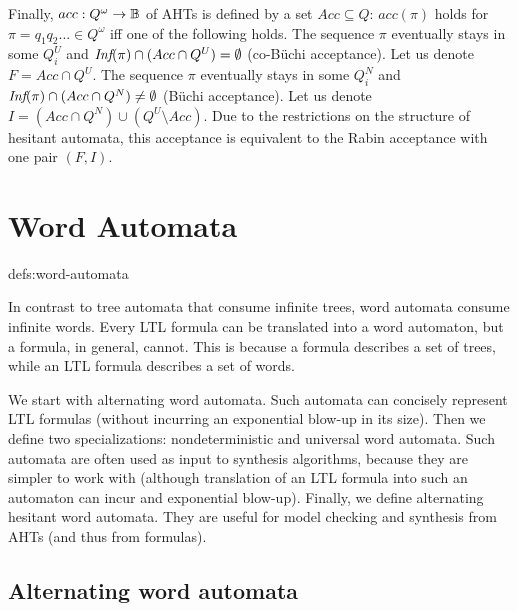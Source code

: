 Finally, $acc: Q^\omega \to \mathbb{B}$ of AHTs is defined by a set $Acc \subseteq Q$:
$acc(\pi)$ holds for $\pi=q_1q_2...\in Q^\omega$ iff one of the following holds.
\li
\- The sequence $\pi$ eventually stays in some $Q^U_i$ and
   $\textit{Inf}(\pi) \cap (Acc\cap Q^U) = \emptyset$
   (co-B\"uchi acceptance).
   Let us denote $F = Acc \cap Q^U$.
\- The sequence $\pi$ eventually stays in some $Q^N_i$ and
   $\textit{Inf}(\pi) \cap (Acc \cap Q^N) \neq \emptyset$
   (B\"uchi acceptance).
   Let us denote $I = (Acc \cap Q^N) \cup (Q^U \!\setminus\! Acc)$.
\il
Due to the restrictions on the structure of hesitant automata,
this acceptance is equivalent to the Rabin acceptance with one pair $(F,I)$.



\toclesslab\section{Word Automata}{defs:word-automata}

In contrast to tree automata that consume infinite trees,
word automata consume infinite words.
Every LTL formula can be translated into a word automaton,
but a \CTLstar formula, in general, cannot.
This is because a \CTLstar formula describes a set of trees,
while an LTL formula describes a set of words.

We start with alternating word automata.
Such automata can concisely represent LTL formulas
(without incurring an exponential blow-up in its size).
Then we define two specializations: nondeterministic and universal word automata.
Such automata are often used as input to synthesis algorithms,
because they are simpler to work with
(although translation of an LTL formula into such an automaton can incur
 and exponential blow-up).
Finally, we define alternating hesitant word automata.
They are useful for model checking and synthesis from AHTs
(and thus from \CTLstar formulas).

\subsection*{Alternating word automata}

